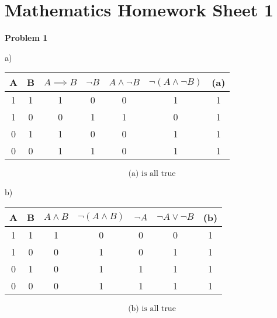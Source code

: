 \documentclass{article}
\begin{document}
\section*{\huge Mathematics Homework Sheet 1}

\begin{flushleft}
   \textbf{Problem 1}
\end{flushleft}

\begin{table}[h!]
   a)
   \centering
   \begin{tabular}{|c|c|c|c|c|c|c|}

      \hline
      A & B & $A \implies B$ & $\neg B$ & $A \land \neg B$ & $\neg (A \land \neg B)$ & (a) \\
      \hline
      1 & 1 & 1              & 0        & 0                & 1                       & 1   \\
      1 & 0 & 0              & 1        & 1                & 0                       & 1   \\
      0 & 1 & 1              & 0        & 0                & 1                       & 1   \\
      0 & 0 & 1              & 1        & 0                & 1                       & 1   \\
      \hline
   \end{tabular}
   \[
      \text{(a) is all true}
   \]
\end{table}

\begin{table}[h!]
   b)
   \centering
   \begin{tabular}{|c|c|c|c|c|c|c|}

      \hline
      A & B & $A \land B$ & $\neg (A \land B)$ & $\neg A$ & $\neg A \lor \neg B$ & (b) \\
      \hline
      1 & 1 & 1           & 0                  & 0        & 0                    & 1   \\
      1 & 0 & 0           & 1                  & 0        & 1                    & 1   \\
      0 & 1 & 0           & 1                  & 1        & 1                    & 1   \\
      0 & 0 & 0           & 1                  & 1        & 1                    & 1   \\
      \hline
   \end{tabular}
   \[
      \text{(b) is all true}
   \]
\end{table}
\end{document}
